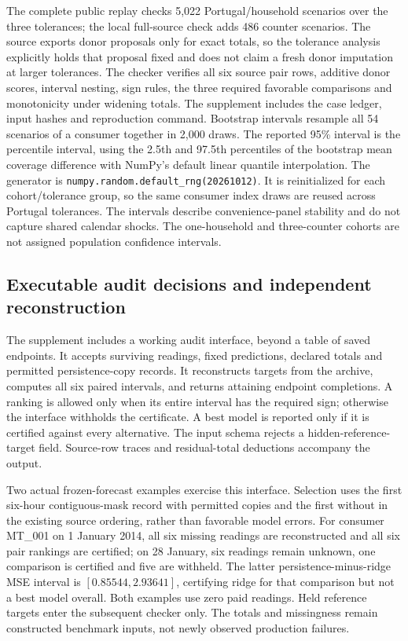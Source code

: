 The complete public replay checks 5,022 Portugal/household scenarios over
the three tolerances; the local full-source check adds 486 counter
scenarios. The source exports donor proposals only for exact totals, so
the tolerance analysis explicitly holds that proposal fixed and does not
claim a fresh donor imputation at larger tolerances. The checker verifies
all six source pair rows, additive donor scores, interval nesting, sign
rules, the three required favorable comparisons and monotonicity under
widening totals. The supplement includes the case ledger, input hashes
and reproduction command. Bootstrap intervals resample all 54 scenarios
of a consumer together in 2,000 draws. The reported 95\% interval is the
percentile interval, using the 2.5th and 97.5th percentiles of the bootstrap
mean coverage difference with NumPy's default linear quantile interpolation.
The generator is \texttt{numpy.random.default\_rng(20261012)}.
It is reinitialized for each cohort/tolerance group, so the same consumer
index draws are reused across Portugal tolerances.
The intervals describe convenience-panel
stability and do not capture shared calendar shocks. The one-household
and three-counter cohorts are not assigned population confidence intervals.
\subsection{Executable audit decisions and independent reconstruction}
\label{sec:executable-gate}
The supplement includes a working audit interface, beyond a table of saved
endpoints. It accepts surviving readings, fixed predictions, declared
totals and permitted persistence-copy records. It reconstructs targets
from the archive, computes all six paired intervals, and returns attaining
endpoint completions. A ranking is allowed only when its entire interval
has the required sign; otherwise the interface withholds the certificate.
A best model is reported only if it is certified against every alternative.
The input schema rejects a hidden-reference-target field. Source-row traces
and residual-total deductions accompany the output.

Two actual frozen-forecast examples exercise this interface. Selection
uses the first six-hour contiguous-mask record with permitted copies and
the first without in the existing source ordering, rather than favorable
model errors. For consumer MT\_001 on 1 January 2014, all six missing
readings are reconstructed and all six pair rankings are certified; on
28 January, six readings remain unknown, one comparison is certified and
five are withheld. The latter persistence-minus-ridge MSE interval is
$[0.85544,2.93641]$, certifying ridge for that comparison but not a best
model overall. Both examples use zero paid readings. Held reference targets
enter the subsequent checker only. The totals and missingness remain
constructed benchmark inputs, not newly observed production failures.

